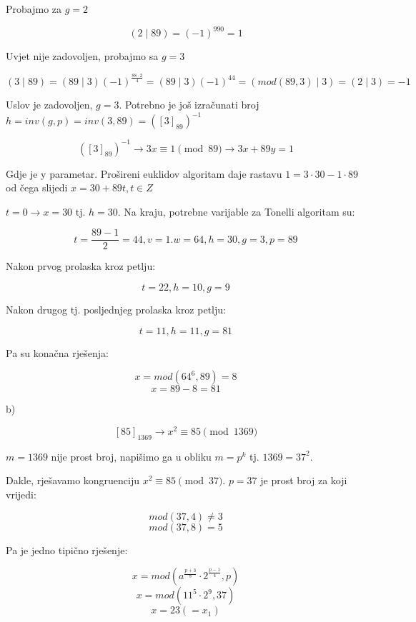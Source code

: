 \documentclass[12pt]{article}
\begin{document}
Probajmo za \underline{$g = 2$}

$$(2\mid89) = (-1)^{990} = 1$$\vspace{1mm}

Uvjet nije zadovoljen, probajmo sa \underline{$g = 3$}

$$(3\mid89) = (89\mid3)(-1)^{\frac{88 \cdot 2}{4}} = (89 \mid 3)(-1)^{44} = (mod(89, 3) \mid 3) = (2 \mid 3) = -1$$\vspace{1mm}

Uslov je zadovoljen, $g = 3$. Potrebno je još izračunati broj $h = inv(g, p) = inv(3, 89) = ([3]_{89})^{-1}$

$$([3]_{89})^{-1} \to 3x \equiv 1 \pmod{89} \to 3x + 89y = 1$$\vspace{1mm}

Gdje je y parametar. Prošireni euklidov algoritam daje rastavu $1 = 3 \cdot 30 - 1 \cdot 89$ od čega slijedi $x = 30 + 89t, t \in Z$

$t = 0 \to x = 30$ tj.  $h = 30$. Na kraju, potrebne varijable za Tonelli algoritam su:

$$t = \frac{89-1}{2} = 44, v = 1. w = 64, h = 30, g = 3, p = 89$$\vspace{1mm}

Nakon prvog prolaska kroz petlju:

$$t = 22, h = 10, g = 9$$\vspace{1mm}

Nakon drugog tj. posljednjeg prolaska kroz petlju:

$$t = 11, h = 11, g = 81$$\vspace{1mm}

Pa su konačna rješenja:

$$x = mod(64^6, 89) = 8$$
$$x = 89 - 8 = 81$$\vspace{1mm}

b)

$$[85]_{1369} \to x^{2} \equiv 85 \pmod{1369}$$\vspace{1mm}

$m = 1369$ nije prost broj, napišimo ga u obliku $m = p^k$ tj. $1369 = 37^2$. 

Dakle, rješavamo kongruenciju $x^2 \equiv 85 \pmod{37}$. $p = 37$ je prost broj za koji vrijedi:

$$mod(37, 4) \neq 3$$
$$mod(37, 8) = 5$$\vspace{1mm}

Pa je jedno tipično rješenje:

$$x = mod(a^{\frac{p + 3}{8}} \cdot 2^{\frac{p - 1}{4}}, p)$$
$$x = mod(11^5 \cdot 2^9, 37)$$
$$x = 23 (= x_{1})$$\vspace{1mm}
\end{document}

